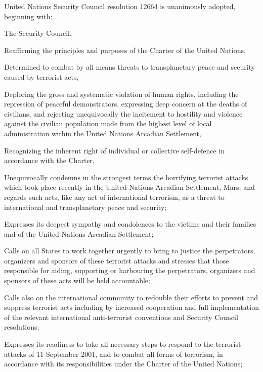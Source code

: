 United Nations Security Council resolution 12664 is unanimously adopted, beginning with:

\startTimelineDocument
The Security Council,

Reaffirming the principles and purposes of the Charter of the United Nations,

Determined to combat by all means threats to transplanetary peace and security caused by terrorist acts,

Deploring the gross and systematic violation of human rights, including the repression of peaceful demonstrators, expressing deep concern at the deaths of civilians, and rejecting unequivocally the incitement to hostility and violence against the civilian population made from the highest level of local administration within the United Nations Arcadian Settlement,

Recognizing the inherent right of individual or collective self-defence in accordance with the Charter,

\startitemize[n]
\setupwhitespace[big]
\item Unequivocally condemns in the strongest terms the horrifying terrorist attacks which took place recently in the United Nations Arcadian Settlement, Mars, and regards such acts, like any act of international terrorism, as a threat to international and transplanetary peace and security;

\item Expresses its deepest sympathy and condolences to the victims and their families and of the United Nations Arcadian Settlement;

\item Calls on all States to work together urgently to bring to justice the perpetrators, organizers and sponsors of these terrorist attacks and stresses that those responsible for aiding, supporting or harbouring the perpetrators, organizers and sponsors of these acts will be held accountable;

\item Calls also on the international community to redouble their efforts to prevent and suppress terrorist acts including by increased cooperation and full implementation of the relevant international anti-terrorist conventions and Security Council resolutions;

\item Expresses its readiness to take all necessary steps to respond to the terrorist attacks of 11 September 2001, and to combat all forms of terrorism, in accordance with its responsibilities under the Charter of the United Nations;

